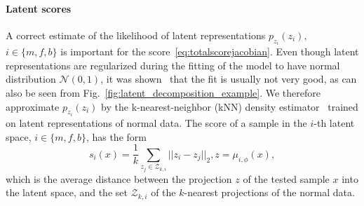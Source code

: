 \paragraph{Latent scores} A correct estimate of the likelihood of latent representations $p_{z_{i}}(z_i),$ $i \in \{m, f, b\}$ is important for the score~\eqref{eq:totalscorejacobian}. Even though latent representations are regularized during the fitting of the model to have normal distribution $\mathcal{N}(0,1)$, it was shown~\cite{dai2019diagnosing} that the fit is usually not very good, as can also be seen from Fig.~\ref{fig:latent_decomposition_example}. We therefore approximate $p_{z_{i}}(z_i)$ by the k-nearest-neighbor (kNN) density estimator~\cite{devroye1977strong} trained on latent representations of normal data. The score of a sample in the $i$-th latent space, $i \in \lbrace m, f, b \rbrace$, has the form
\begin{equation} \label{eq:knnscore}
    s_{i}(x) = \frac{1}{k} \sum_{z_j \in \mathcal{Z}_{k,i}} \vert \vert z_i - z_j \vert \vert_2, z = \mu_{i,\phi}(x), 
\end{equation}
which is the average distance between the projection $z$ of the tested sample $x$ into the latent space, and the set $\mathcal{Z}_{k,i}$ of the $k$-nearest projections of the normal data.

